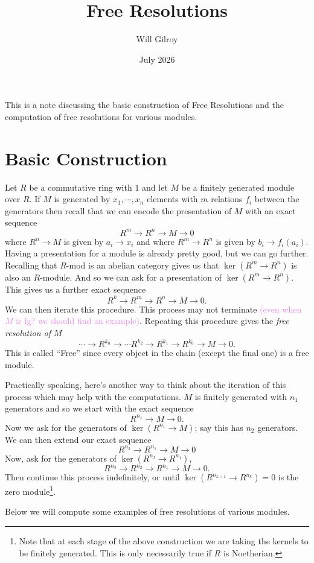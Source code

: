 \documentclass{article}
\title{
    Free Resolutions
}
\author{Will Gilroy}
\date{July 2026}
\theoremstyle{definition}
\theoremstyle{remark}
\newcommand{\wg}[1]{\textcolor{violet}{#1}}
\begin{document}
\maketitle

This is a note discussing the basic construction of Free Resolutions and the
computation of free resolutions for various modules.

\section{Basic Construction}
Let $R$ be a commutative ring with $1$ and let $M$ be a finitely generated
module over $R$.
If $M$ is generated by $x_1, \cdots, x_n$ elements with $m$ relations $f_i$ between the generators
then recall that we can encode the presentation of $M$ with an exact sequence
\[
    R^m \to R^n \to M \to 0
\]
where $R^n \to M$ is given by $a_i \to x_i$ and where $R^m \to R^n$ is given by
$b_i \to f_i(a_i)$. 
Having a presentation for a module is already pretty good, but 
we can go further. Recalling that $R$-mod
is an abelian category gives us that $\ker(R^m \to R^n)$
is also an $R$-module.
And so we can ask for a presentation of $\ker(R^m \to R^n)$. This gives us a
further exact sequence
\[
    R^{k} \to R^m \to R^n \to M \to 0. 
\]
We can then iterate this procedure. 
This process may not
terminate \wg{(even when $M$ is fg? we should find an example)}.
Repeating this procedure gives the \textit{free resolution of $M$}
\[
    \cdots \to R^{k_n} \to \cdots R^{k_2} \to R^{k_1} \to R^{k_0} \to M \to 0.
\]
This is called 
``Free'' since every object in the chain (except the final one) is a free
module. 

Practically speaking, here's another way to think about the iteration of this process which may help
with the computations. $M$ is finitely generated with $n_1$ generators and so we start with the exact
sequence
\[
    R^{n_1} \to M \to 0.
\]
Now we ask for the generators
of $\ker(R^{n_1} \to M)$; say this has $n_2$
generators. We can then extend our exact
sequence 
\[
    R^{n_2} \to R^{n_1} \to M \to 0
\]
Now, ask for the generators of $\ker(R^{n_2} \to R^{n_1})$, 
\[
    R^{n_3} \to R^{n_2} \to R^{n_1} \to M \to 0. 
\]
Then continue this process indefinitely, or until $\ker(R^{n_{k+1}} \to R^{n_k}) =
0$ is the zero module\footnote{
    Note that at each stage of the above construction we are taking 
the kernels to be finitely generated. This is only necessarily true if $R$ is
Noetherian.
}.

Below we will compute some examples of free resolutions of various modules.
\end{document}
